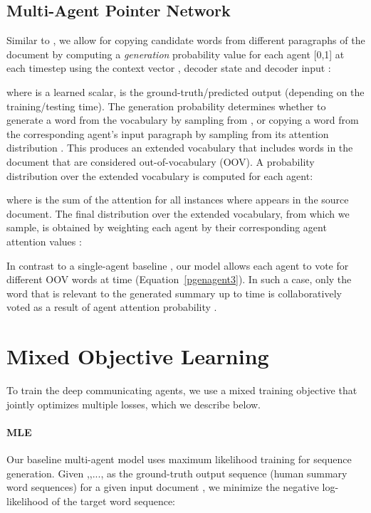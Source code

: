 \documentclass[11pt,a4paper]{article}
\begin{document}
%
 \subsection{Multi-Agent Pointer Network}
\label{sec:mapointernet}


Similar to \citet{summpoinernet}, we allow for copying candidate words from different paragraphs of the document by computing a \textit{generation} probability value for each agent  [0,1] at each timestep  using the context vector , decoder state  and decoder input :
\vspace*{-1mm}

where  is a learned scalar,  is the ground-truth/predicted output (depending on the training/testing time). The generation probability determines whether to generate a word from the vocabulary by sampling from , or copying a word from the corresponding agent's input paragraph  by sampling from its attention distribution . 
This produces an extended vocabulary that includes words in the document that are considered out-of-vocabulary (OOV).
A probability distribution over the extended vocabulary is computed for each agent:

 where  is the sum of the attention for all instances where  appears in the source document.
The final distribution over the extended vocabulary, from which we sample, is obtained by weighting each agent by their corresponding agent attention values :


\noindent In contrast to a single-agent baseline \cite{summpoinernet}, our model allows each agent to vote for different OOV words at time  (Equation~\eqref{pgenagent3}). In such a case, only the word that is relevant to the generated summary up to time  is collaboratively voted as a result of agent attention probability .    \section{Mixed Objective Learning}
\label{ssec:rewards}

To train the deep communicating agents, we use a mixed training objective that jointly optimizes multiple losses, which we describe below.

\paragraph{MLE}
Our baseline multi-agent model uses maximum likelihood training for sequence generation. Given ,,..., as the ground-truth output sequence (human summary word sequences) for a given input document , we minimize the negative log-likelihood of the target word sequence:
\end{document}
